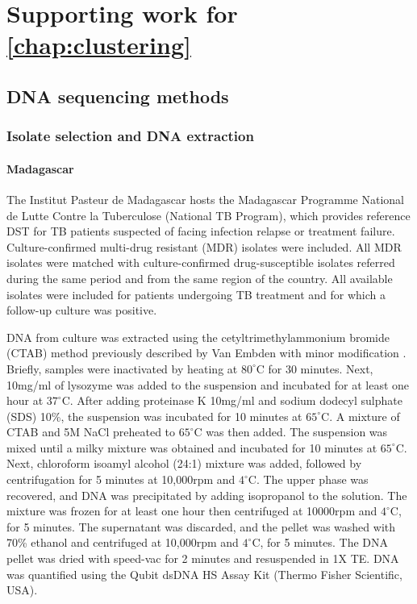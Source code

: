 \chapter{Supporting work for \autoref*{chap:clustering}}


\section{DNA sequencing methods}
\label{app:dna-sequencing}
\subsection{Isolate selection and DNA extraction}

\subsubsection{Madagascar}
The Institut Pasteur de Madagascar hosts the Madagascar Programme National de Lutte Contre la Tuberculose (National TB Program), which provides reference DST for TB patients suspected of facing infection relapse or treatment failure. Culture-confirmed multi-drug resistant (MDR) isolates were included. All MDR isolates were matched with culture-confirmed drug-susceptible isolates referred during the same period and from the same region of the country. All available isolates were included for patients undergoing TB treatment and for which a follow-up culture was positive. 

DNA from \mtb{} culture was extracted using the cetyltrimethylammonium bromide (CTAB) method previously described by Van Embden with minor modification \cite{vanEmbden1993}. Briefly, samples were inactivated by heating at $80^\circ$C for 30 minutes. Next, 10mg/ml of lysozyme was added to the suspension and incubated for at least one hour at $37^\circ$C. After adding proteinase K 10mg/ml and sodium dodecyl sulphate (SDS) 10\%, the suspension was incubated for 10 minutes at $65^\circ$C. A mixture of CTAB and 5M NaCl preheated to $65^\circ$C was then added. The suspension was mixed until a milky mixture was obtained and incubated for 10 minutes at $65^\circ$C. Next, chloroform isoamyl alcohol (24:1) mixture was added, followed by centrifugation for 5 minutes at 10,000rpm and $4^\circ$C. The upper phase was recovered, and DNA was precipitated by adding isopropanol to the solution. The mixture was frozen for at least one hour then centrifuged at 10000rpm and $4^\circ$C, for 5 minutes. The supernatant was discarded, and the pellet was washed with 70\% ethanol and centrifuged at 10,000rpm and $4^\circ$C, for 5 minutes. The DNA pellet was dried with speed-vac for 2 minutes and resuspended in 1X TE. DNA was quantified using the Qubit dsDNA HS Assay Kit (Thermo Fisher Scientific, USA).

